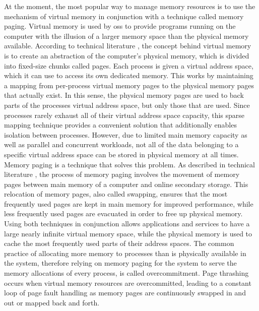 At the moment, the most popular way to manage memory resources is to use the mechanism of virtual memory in conjunction with a technique called memory paging.
Virtual memory is used by \acp{os} to provide programs running on the computer with the illusion of a larger memory space than the physical memory available.
According to technical literature \cite{mos2009}, the concept behind virtual memory is to create an abstraction of the computer's physical memory, which is divided into fixed-size chunks called pages.
Each process is given a virtual address space, which it can use to access its own dedicated memory.
This works by maintaining a mapping from per-process virtual memory pages to the physical memory pages that actually exist.
In this sense, the physical memory pages are used to back parts of the processes virtual address space, but only those that are used.
Since processes rarely exhaust all of their virtual address space capacity, this sparse mapping technique provides a convenient solution that additionally enables isolation between processes.
However, due to limited main memory capacity as well as parallel and concurrent workloads, not all of the data belonging to a specific virtual address space can be stored in physical memory at all times.
Memory paging is a technique that solves this problem.
As described in technical literature \cite{mos2009}, the process of memory paging involves the movement of memory pages between main memory of a computer and online secondary storage.
This relocation of memory pages, also called swapping, ensures that the most frequently used pages are kept in main memory for improved performance, while less frequently used pages are evacuated in order to free up physical memory.
Using both techniques in conjunction allows applications and services to have a large nearly infinite virtual memory space, while the physical memory is used to cache the most frequently used parts of their address spaces.
The common practice of allocating more memory to processes than is physically available in the system, therefore relying on memory paging for the system to serve the memory allocations of every process, is called overcommitment.
Page thrashing occurs when virtual memory resources are overcommitted, leading to a constant loop of page fault handling as memory pages are continuously swapped in and out or mapped back and forth.

